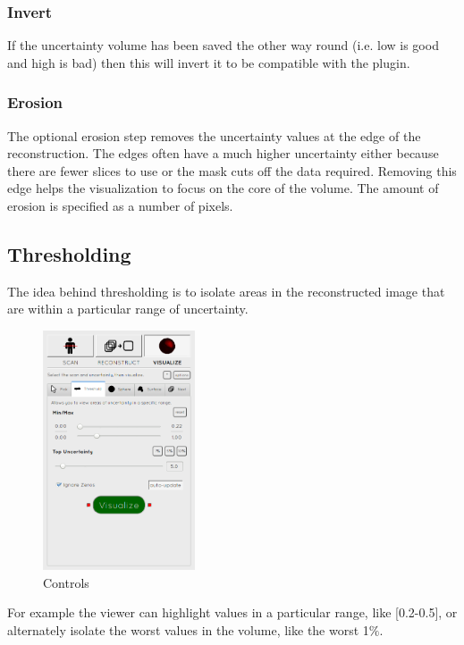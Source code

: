 \subsubsection*{Invert}
If the uncertainty volume has been saved the other way round (i.e. low is good and high is bad) then this will invert it to be compatible with the plugin.

\subsubsection*{Erosion}
The optional erosion step removes the uncertainty values at the edge of the reconstruction. The edges often have a much higher uncertainty either because there are fewer slices to use or the mask cuts off the data required. Removing this edge helps the visualization to focus on the core of the volume. The amount of erosion is specified as a number of pixels.

\clearpage
\subsection{Thresholding}\label{implementation:thresholding}
The idea behind thresholding is to isolate areas in the reconstructed image that are within a particular range of uncertainty. 

\begin{figure}
  \vspace{-20pt}
  \includegraphics[width=0.4\textwidth]{images/tool/2_thresholding.png}
  \caption{Controls}\label{fig:threshold_settings}
\end{figure}

For example the viewer can highlight values in a particular range, like [0.2-0.5], or alternately isolate the worst values in the volume, like the worst 1$\%$.

